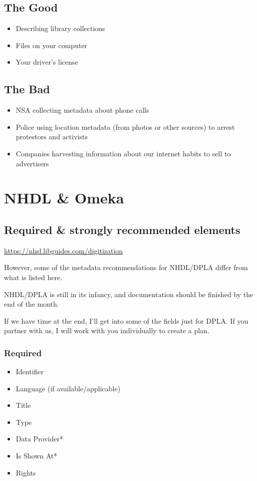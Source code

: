 \documentclass[11pt]{article}
\begin{document}
\subsection*{The Good}
\label{sec:org3847bb7}
\begin{itemize}
\item Describing library collections
\item Files on your computer
\item Your driver's license
\end{itemize}

\subsection*{The Bad}
\label{sec:org6397983}
\begin{itemize}
\item NSA collecting metadata about phone calls
\item Police using location metadata (from photos or other sources) to arrest protestors and activists
\item Companies harvesting information about our internet habits to sell to advertisers
\end{itemize}

\section*{NHDL \& Omeka}
\label{sec:org2e665a1}
\subsection*{Required \& strongly recommended elements}
\label{sec:orgd97e3e9}

\url{https://nhsl.libguides.com/digitization}

However, some of the metadata recommendations for NHDL/DPLA differ from what is listed here.

NHDL/DPLA is still in its infancy, and documentation should be finished by the end of the month.

If we have time at the end, I'll get into some of the fields just for DPLA.
If you partner with us, I will work with you individually to create a plan.

\subsubsection*{Required}
\label{sec:org2c7fab7}
\begin{itemize}
\item Identifier
\item Language (if available/applicable)
\item Title
\item Type
\item Data Provider*
\item Is Shown At*
\item Rights
\end{itemize}
\end{document}
